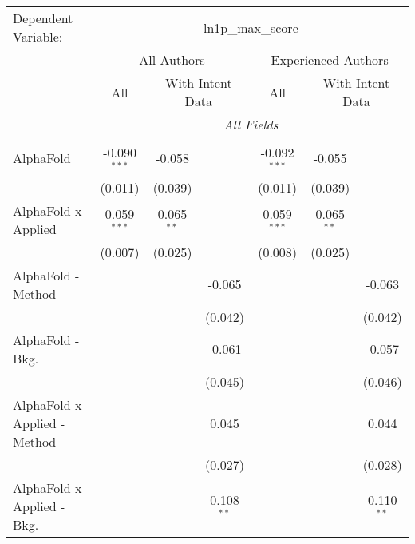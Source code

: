 \begingroup
\centering
\begin{tabular}{lcccccc}
   \tabularnewline \midrule \midrule
   Dependent Variable: & \multicolumn{6}{c}{ln1p\_max\_score}\\
 & \multicolumn{3}{c}{All Authors} & \multicolumn{3}{c}{Experienced Authors} \\
\cmidrule(lr){2-4} \cmidrule(lr){5-7}
 & \multicolumn{1}{c}{All} & \multicolumn{2}{c}{With Intent Data} & \multicolumn{1}{c}{All} & \multicolumn{2}{c}{With Intent Data} \\
\cmidrule(lr){2-2} \cmidrule(lr){3-4} \cmidrule(lr){5-5} \cmidrule(lr){6-7}
 & \multicolumn{6}{c}{\textit{All Fields}} \\ \\
   AlphaFold                      & -0.090$^{***}$ & -0.058       &                & -0.092$^{***}$ & -0.055       &   \\   
                                  & (0.011)        & (0.039)      &                & (0.011)        & (0.039)      &   \\   
   AlphaFold x Applied            & 0.059$^{***}$  & 0.065$^{**}$ &                & 0.059$^{***}$  & 0.065$^{**}$ &   \\   
                                  & (0.007)        & (0.025)      &                & (0.008)        & (0.025)      &   \\   
   AlphaFold - Method             &                &              & -0.065         &                &              & -0.063\\   
                                  &                &              & (0.042)        &                &              & (0.042)\\   
   AlphaFold - Bkg.               &                &              & -0.061         &                &              & -0.057\\   
                                  &                &              & (0.045)        &                &              & (0.046)\\   
   AlphaFold x Applied - Method   &                &              & 0.045          &                &              & 0.044\\   
                                  &                &              & (0.027)        &                &              & (0.028)\\   
   AlphaFold x Applied - Bkg.     &                &              & 0.108$^{**}$   &                &              & 0.110$^{**}$\\   

\end{tabular}
